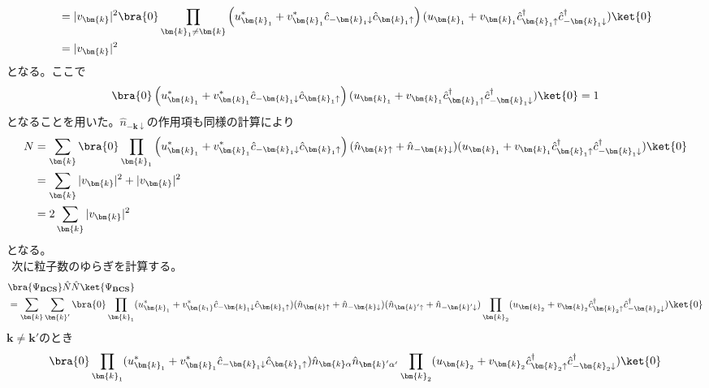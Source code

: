 \documentclass[dvipdfmx, 11pt, a4paper]{jsarticle}
\numberwithin{equation}{section}
\theoremstyle{definition}
\begin{document}
\begin{derivationBox}
\begin{align}
            &= |v_{\bm{k}}|^2 \bra{0}\prod_{\bm{k}_1 \ne \bm{k} } \left( u_{\bm{k}_1}^* + v_{\bm{k}_1}^* \hat{c}_{-\bm{k}_1\downarrow}\hat{c}_{\bm{k}_1\uparrow} \right) ( u_{\bm{k}_1} + v_{\bm{k}_1} \hat{c}^\dagger_{\bm{k}_1\uparrow}\hat{c}^\dagger_{-\bm{k}_1\downarrow} ) \ket{0}\notag \\
            &= |v_{\bm{k}}|^2
        \end{align}
        となる。ここで
        \begin{align}
            \bra{0} \left( u_{\bm{k}_1}^* + v_{\bm{k}_1}^* \hat{c}_{-\bm{k}_1\downarrow}\hat{c}_{\bm{k}_1\uparrow} \right) ( u_{\bm{k}_1} + v_{\bm{k}_1} \hat{c}^\dagger_{\bm{k}_1\uparrow}\hat{c}^\dagger_{-\bm{k}_1\downarrow} ) \ket{0} = 1
        \end{align}
        となることを用いた。$\hat{n}_{-\bm{k}\downarrow}$の作用項も同様の計算により
        \begin{align}
            N &=\sum_{\bm{k}} \bra{0} \prod_{\bm{k}_1}\left( u_{\bm{k}_1}^* + v_{\bm{k}_1}^* \hat{c}_{-\bm{k}_1\downarrow}\hat{c}_{\bm{k}_1\uparrow} \right)(\hat{n}_{\bm{k}\uparrow} + \hat{n}_{-\bm{k}\downarrow})( u_{\bm{k}_1} + v_{\bm{k}_1} \hat{c}^\dagger_{\bm{k}_1\uparrow}\hat{c}^\dagger_{-\bm{k}_1\downarrow} ) \ket{0} \notag \\
            &= \sum_{\bm{k}} |v_{\bm{k}}|^2 + |v_{\bm{k}}|^2 \notag \\
            &= 2\sum_{\bm{k}} |v_{\bm{k}}|^2
        \end{align}
        となる。\\
        $\ \ $次に粒子数のゆらぎを計算する。
        \begin{align}
            &\bra{\Psi_{\textbf{BCS}}} \hat{N} \hat{N}\ket{\Psi_{\textbf{BCS}}} \notag \\
            &= \sum_{\bm{k}} \sum_{\bm{k}'} \bra{0} \prod_{\bm{k}_1} (u_{\bm{k}_1}^* + v_{\bm{k_1}}^* \hat{c}_{-\bm{k}_1\downarrow}\hat{c}_{\bm{k}_1\uparrow})(\hat{n}_{\bm{k}\uparrow}+\hat{n}_{-\bm{k}\downarrow})(\hat{n}_{\bm{k}'\uparrow}+\hat{n}_{-\bm{k}'\downarrow})\prod_{\bm{k}_2}(u_{\bm{k}_2}+v_{\bm{k}_2}\hat{c}_{\bm{k}_2\uparrow}^\dagger\hat{c}_{-\bm{k}_2\downarrow}^\dagger)\ket{0}
        \end{align}
        $\bm{k}\ne\bm{k}'$のとき
        \begin{align}
            &\bra{0} \prod_{\bm{k}_1} (u_{\bm{k}_1}^* + v_{\bm{k}_1}^* \hat{c}_{-\bm{k}_1\downarrow}\hat{c}_{\bm{k}_1\uparrow})\hat{n}_{\bm{k}\alpha}\hat{n}_{\bm{k}'\alpha'}\prod_{\bm{k}_2}(u_{\bm{k}_2}+v_{\bm{k}_2}\hat{c}_{\bm{k}_2\uparrow}^\dagger\hat{c}_{-\bm{k}_2\downarrow}^\dagger)\ket{0} \notag \\

\end{align}
\end{derivationBox}
\end{document}
